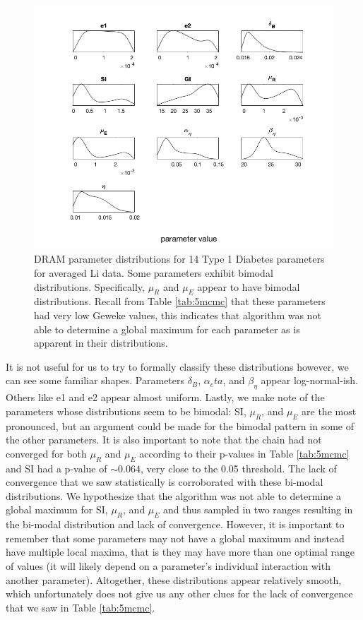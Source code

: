 \begin{figure}[H]
    \centering
    \includegraphics[width=15cm]{MCMC_figs/dram_t1d_final/jul10_avg_run1(noIC)_acute_NOD_waveOn_lietal_den.png}
    \caption{DRAM parameter distributions for 14 Type 1 Diabetes parameters for averaged Li data. Some parameters exhibit bimodal distributions. Specifically, $\mu_R$ and $\mu_E$ appear to have bimodal distributions. Recall from Table \ref{tab:5mcmc} that these parameters had very low Geweke values, this indicates that algorithm was not able to determine a global maximum for each parameter as is apparent in their distributions.}
    \label{fig:15mcmc}
\end{figure}
It is not useful for us to try to formally classify these distributions however, we can see some familiar shapes. Parameters $\delta_B$, $\alpha_eta$, and $\beta_{\eta}$ appear log-normal-ish. Others like e1 and e2 appear almost uniform. Lastly, we make note of the parameters whose distributions seem to be bimodal: SI, $\mu_R$, and $\mu_E$ are the most pronounced, but an argument could be made for the bimodal pattern in some of the other parameters. It is also important to note that the chain had not converged for both $\mu_R$ and $\mu_E$ according to their p-values in Table \ref{tab:5mcmc} and SI had a p-value of $\sim 0.064$, very close to the 0.05 threshold. The lack of convergence that we saw statistically is corroborated with these bi-modal distributions. We hypothesize that the algorithm was not able to determine a global maximum for SI, $\mu_R$, and $\mu_E$ and thus sampled in two ranges resulting in the bi-modal distribution and lack of convergence. However, it is important to remember that some parameters may not have a global maximum and instead have multiple local maxima, that is they may have more than one optimal range of values (it will likely depend on a parameter's individual interaction with another parameter). Altogether, these distributions appear relatively smooth, which unfortunately does not give us any other clues for the lack of convergence that we saw in Table \ref{tab:5mcmc}.
